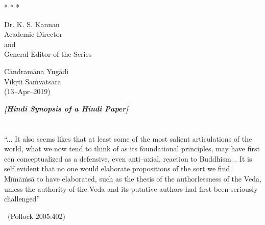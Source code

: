 \vskip 3pt

\begin{center}
* * *
\end{center}

\vskip 3pt

\begin{flushright}
Dr. K. S. Kannan\\ Academic Director\\ and\\ General Editor of the Series
\end{flushright}

Cāndramāna Yugādi\\ Vikṛti Saṁvatsara\\ (13–Apr–2019)

\begin{center}
\textbf{\textit{[Hindi Synopsis of a Hindi Paper]}}
\end{center}

\section*{}




\begin{myquote}
“... It also seems likes that at least some of the most salient articulations of the world, what we now tend to think of as its foundational principles, may have first een conceptualized as a defensive, even anti–axial, reaction to Buddhism... It is self evident that no one would elaborate propositions of the sort we find Mīmāṁsā to have elaborated, such as the thesis of the authorlessness of the Veda, unless the authority of the Veda and its putative authors had first been seriously challenged” 

~\hfill (Pollock 2005:402)
\end{myquote}

